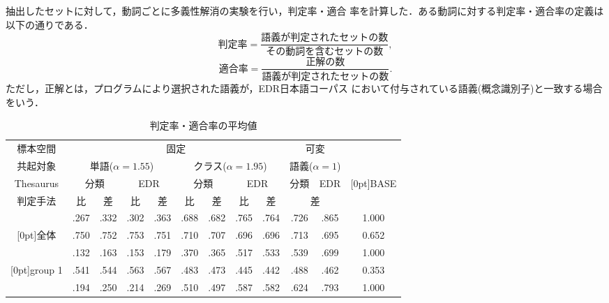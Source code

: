 抽出したセットに対して，動詞ごとに多義性解消の実験を行い，判定率・適合
率を計算した．ある動詞に対する判定率・適合率の定義は以下の通りである．
\begin{equation}
  \label{app}
  \mbox{判定率} = \frac{\mbox{語義が判定されたセットの数}}{\mbox{その動詞を含むセットの数}},
\end{equation}
\begin{equation}
  \label{pr}
  \mbox{適合率} = \frac{\mbox{正解の数}}{\mbox{語義が判定されたセットの数}}.
\end{equation}
ただし，正解とは，プログラムにより選択された語義が，EDR日本語コーパス
において付与されている語義(概念識別子)と一致する場合をいう．

\begin{table}[htbp]
   \begin{center}
      \leavevmode
      \caption{判定率・適合率の平均値}
      \label{tab:results}
      \smallskip
      \begin{tabular}{|c|cc|cc|cc|cc|cc|c|}\hline
                   標本空間 & \multicolumn{8}{c|}{固定} & \multicolumn{2}{c|}{可変} &      \\
\cline{1-2}\cline{2-9}\cline{10-11}
                   共起対象 & \multicolumn{4}{c|}{単語($\alpha=1.55$)} & \multicolumn{4}{c|}{クラス($\alpha=1.95$)} & \multicolumn{2}{c|}{語義($\alpha=1$)} &      \\
\cline{1-2}\cline{2-5}\cline{6-9}\cline{10-11}
                  Thesaurus & \multicolumn{2}{c|}{分類} & \multicolumn{2}{c|}{EDR} & \multicolumn{2}{c|}{分類} & \multicolumn{2}{c|}{EDR} &  分類 &   EDR &    \raisebox{1.6ex}[0pt]{BASE}  \\
\cline{1-2}\cline{2-3}\cline{4-5}\cline{6-7}\cline{8-9}\cline{10-11}
                    判定手法 &    比 &    差 &    比 &    差 &    比 &    差 &    比 &     差 & \multicolumn{2}{c|}{差} &  \\ \hline \hline 
                            & .267 & .332 & .302 & .363 & .688 & .682 & .765 &  .764 & .726 & .865 & 1.000\\
\raisebox{1.6ex}[0pt]{全体} & .750 & .752 & .753 & .751 & .710 & .707 & .696 &  .696 & .713 & .695 & 0.652\\ \hline \hline 
                            & .132 & .163 & .153 & .179 & .370 & .365 & .517 &  .533 & .539 & .699 & 1.000\\
   \raisebox{1.6ex}[0pt]{group 1} & .541 & .544 & .563 & .567 & .483 & .473 & .445 &  .442 & .488 & .462 & 0.353\\ \hline 
                            & .194 & .250 & .214 & .269 & .510 & .497 & .587 &  .582 & .624 & .793 & 1.000\\

\end{tabular}
\end{center}
\end{table}
